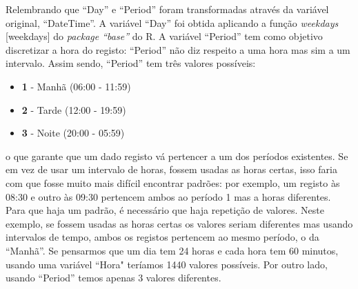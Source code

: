 Relembrando que ``Day'' e ``Period'' foram transformadas através da variável original, ``DateTime''. A variável ``Day'' foi obtida aplicando a função \textit{weekdays} [weekdays] do \textit{package ``base''} do R. A variável ``Period'' tem como objetivo discretizar a hora do registo: ``Period'' não diz respeito a uma hora mas sim a um intervalo. Assim sendo, ``Period'' tem três valores possíveis:

\begin{itemize}
\item \textbf{1} - Manhã (06:00 - 11:59)
\item \textbf{2} - Tarde (12:00 - 19:59)
\item \textbf{3} - Noite (20:00 - 05:59)
\end{itemize}

o que garante que um dado registo vá pertencer a um dos períodos existentes. Se em vez de usar um intervalo de horas, fossem usadas as horas certas, isso faria com que fosse muito mais difícil encontrar padrões: por exemplo, um registo às 08:30 e outro às 09:30 pertencem ambos ao período 1 mas a horas diferentes. Para que haja um padrão, é necessário que haja repetição de valores. Neste exemplo, se fossem usadas as horas certas os valores seriam diferentes mas usando intervalos de tempo, ambos os registos pertencem ao mesmo período, o da ``Manhã''. Se pensarmos que um dia tem 24 horas e cada hora tem 60 minutos, usando uma variável ``Hora" teríamos 1440 valores possíveis. Por outro lado, usando ``Period'' temos apenas 3 valores diferentes. 

